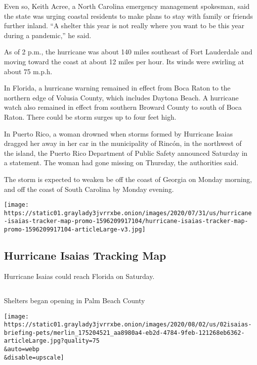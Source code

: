 Even so, Keith Acree, a North Carolina emergency management spokesman,
said the state was urging coastal residents to make plans to stay with
family or friends further inland. ``A shelter this year is not really
where you want to be this year during a pandemic,'' he said.

As of 2 p.m., the hurricane was about 140 miles southeast of Fort
Lauderdale and moving toward the coast at about 12 miles per hour. Its
winds were swirling at about 75 m.p.h.

In Florida, a hurricane warning remained in effect from Boca Raton to
the northern edge of Volusia County, which includes Daytona Beach. A
hurricane watch also remained in effect from southern Broward County to
south of Boca Raton. There could be storm surges up to four feet high.

In Puerto Rico, a woman drowned when storms formed by Hurricane Isaias
dragged her away in her car in the municipality of Rincón, in the
northwest of the island, the Puerto Rico Department of Public Safety
announced Saturday in a statement. The woman had gone missing on
Thursday, the authorities said.

The storm is expected to weaken be off the coast of Georgia on Monday
morning, and off the coast of South Carolina by Monday evening.

\href{https://www.nytimes3xbfgragh.onion/interactive/2020/07/31/us/hurricane-isaias-tracker-map.html}{}

\texttt{[image: https://static01.graylady3jvrrxbe.onion/images/2020/07/31/us/hurricane-isaias-tracker-map-promo-1596209917104/hurricane-isaias-tracker-map-promo-1596209917104-articleLarge-v3.jpg]}

\hypertarget{hurricane-isaias-tracking-map}{%
\subsection{Hurricane Isaias Tracking
Map}\label{hurricane-isaias-tracking-map}}

Hurricane Isaias could reach Florida on Saturday.

\hypertarget{-1}{%
\subsection{}\label{-1}}

Shelters began opening in Palm Beach County

\texttt{[image: https://static01.graylady3jvrrxbe.onion/images/2020/08/02/us/02isaias-briefing-pets/merlin\_175204521\_aa8980a4-eb2d-4784-9feb-121268eb6362-articleLarge.jpg?quality=75\\\&auto=webp\\\&disable=upscale]}

